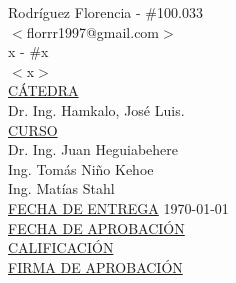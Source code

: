 \begin{titlepage}
\begin{tabbing}
		Rodríguez Florencia	\>\>- \#100.033\\
		\>\footnotesize{$<$florrr1997@gmail.com$>$}\\
		
		x	\>\>- \#x\\
		\>\footnotesize{$<$x$>$}\\
		
		\<\underline{CÁTEDRA}\\[0.2cm]
		Dr. Ing. Hamkalo, José Luis. \\
		
		\<\underline{CURSO}\\[0.2cm]
		Dr. Ing. Juan Heguiabehere \\
		Ing. Tomás Niño Kehoe \\
		 Ing. Matías Stahl \\[1cm]
		
		\<\underline{FECHA DE ENTREGA}\>\>\> \today
		\\[0.2cm]
		
		\<\underline{FECHA DE APROBACIÓN}\>\>\> 
		\\[0.2cm]
		
		\<\underline{CALIFICACIÓN}\>\>\> 
		\\[0.2cm]
		
		\<\underline{FIRMA DE APROBACIÓN}
		\\[0.5cm]
		
	\end{tabbing}
	
	
	
	
\end{titlepage}

\clearpage

\tableofcontents							

\clearpage

